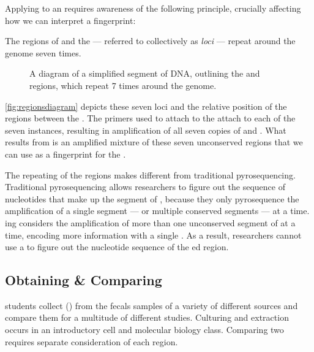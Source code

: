 Applying \pcr{} to an \ecoli{} \isol{} requires awareness of the following principle, crucially affecting how we can interpret a fingerprint:

\begin{principle}
The \itsshort{} regions of \ecoli{} and the \rrna{} --- referred to collectively as \textit{loci} --- repeat around the \ecoli{} genome seven times.
\end{principle}

\begin{figure}
    \centering
    
    \caption{A diagram of a simplified segment of \ecoli{} DNA, outlining the \Ssixt{} and \Sfive{} \itsshort{} regions, which repeat 7 times around the \ecoli{} genome.}
    \label{fig:regionsdiagram}
\end{figure}
\autoref{fig:regionsdiagram} depicts these seven loci and the relative position of the \itsshort{} regions between the \rrna{}.
The primers used to attach to the \rrna{} attach to each of the seven instances, resulting in \pcr{} amplification of all seven copies of \Ssixt{} and \Sfive{}.
What results from \pcr{} is an amplified mixture of these seven unconserved \itsshort{} regions that we can use as a fingerprint for the \isol{}.


The repeating of the \itsshort{} regions makes \pyros{} different from traditional pyrosequencing.
Traditional pyrosequencing allows researchers to figure out the sequence of nucleotides that make up the segment of \dna{}, because they only pyrosequence the \pcr{} amplification of a single segment --- or multiple conserved segments --- at a time.
\Pyro{}ing considers the \pcr{} amplification of more than one unconserved segment of \dna{} at a time, encoding more information with a single \pyro{}.
As a result, \cplop{} researchers cannot use a \pyro{} to figure out the nucleotide sequence of the \pyro{}ed \itsshort{} region.

\subsection{Obtaining \& Comparing \ecolilong{} \Isols{}}\label{sec:isolates}
\cp{} students collect \ecolilong{} (\ecoli{}) \isols{} from the fecals samples of a variety of different sources and compare them for a multitude of different studies.
Culturing and \ecoli{} extraction occurs in an introductory cell and molecular biology class.
Comparing two \isols{} requires separate consideration of each \itsshort{} region.

